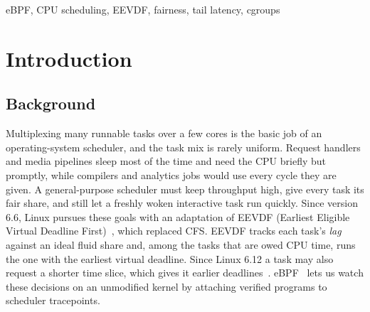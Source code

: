 \documentclass[conference]{IEEEtran}
\begin{document}
\begin{IEEEkeywords}
eBPF, CPU scheduling, EEVDF, fairness, tail latency, cgroups
\end{IEEEkeywords}

\section{Introduction}

\subsection{Background}
Multiplexing many runnable tasks over a few cores is the basic job of an operating-system scheduler, and the task mix is rarely uniform. Request handlers and media pipelines sleep most of the time and need the CPU briefly but promptly, while compilers and analytics jobs would use every cycle they are given. A general-purpose scheduler must keep throughput high, give every task its fair share, and still let a freshly woken interactive task run quickly. Since version 6.6, Linux pursues these goals with an adaptation of EEVDF (Earliest Eligible Virtual Deadline First)~\cite{stoica1996eevdf,kernel-eevdf}, which replaced CFS. EEVDF tracks each task's \emph{lag} against an ideal fluid share and, among the tasks that are owed CPU time, runs the one with the earliest virtual deadline. Since Linux 6.12 a task may also request a shorter time slice, which gives it earlier deadlines~\cite{corbet2024eevdf}. eBPF~\cite{kernel-bpf} lets us watch these decisions on an unmodified kernel by attaching verified programs to scheduler tracepoints.
\end{document}
